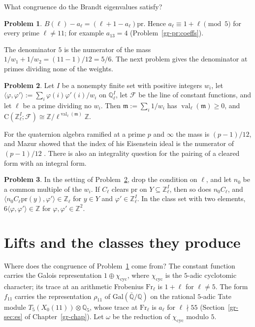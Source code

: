 \documentclass[reqno]{amsart}
\newcounter{chap}
\theoremstyle{definition}
\newtheorem{problem}{Problem}[section]
\newcommand{\Z}{\mathbb{Z}}
\newcommand{\Q}{\mathbb{Q}}
\newcommand{\Cg}{\mathrm{C}}
\newcommand{\pr}{\mathrm{pr}}
\newcommand{\Frob}{\mathrm{Fr}}
\newcommand{\cyc}{\chi_{\mathrm{cyc}}}
\newcommand{\val}{\operatorname{val}}
\begin{document}
What congruence do the Brandt eigenvalues satisfy?

\begin{problem}\label{pr:eleven-cong}
\(B(\ell) - a_\ell = (\ell + 1 - a_\ell)\pr\).  Hence \(a_\ell \equiv 1 + \ell \pmod 5\) for every prime \(\ell \ne 11\); for example \(a_{13} = 4\) (Problem~\ref{gr-pr:coeffs}).
\end{problem}

The denominator \(5\) is the numerator of the mass \(1/w_1 + 1/w_2 = (11 - 1)/12 = 5/6\).  The next problem gives the denominator at primes dividing none of the weights.

\begin{problem}\label{pr:mass}
Let \(I\) be a nonempty finite set with positive integers \(w_i\), let \(\langle \varphi, \varphi' \rangle := \sum_i \varphi(i)\varphi'(i)/w_i\) on \(\Q_\ell^I\), let \(\mathcal F\) be the line of constant functions, and let \(\ell\) be a prime dividing no \(w_i\).  Then \(\mathfrak m := \sum_i 1/w_i\) has \(\val_\ell(\mathfrak m) \ge 0\), and \(\Cg(\Z_\ell^I; \mathcal F) \cong \Z/\ell^{\val_\ell(\mathfrak m)}\Z\).
\end{problem}

For the quaternion algebra ramified at a prime \(p\) and \(\infty\) the mass is \((p-1)/12\), and Mazur showed that the index of his Eisenstein ideal is the numerator of \((p-1)/12\) \cite{Ma}.  There is also an integrality question for the pairing of a cleared form with an integral form.

\begin{problem}\label{pr:pairing}
In the setting of Problem~\ref{pr:mass}, drop the condition on \(\ell\), and let \(n_0\) be a common multiple of the \(w_i\).  If \(C_\ell\) clears \(\pr\) on \(Y \subseteq \Z_\ell^I\), then so does \(n_0C_\ell\), and \(\langle n_0C_\ell\pr(y), \varphi' \rangle \in \Z_\ell\) for \(y \in Y\) and \(\varphi' \in \Z_\ell^I\).  In the class set with two elements, \(6\langle \varphi, \varphi' \rangle \in \Z\) for \(\varphi, \varphi' \in \Z^2\).
\end{problem}

\section{Lifts and the classes they produce}\label{sec:classes}

Where does the congruence of Problem~\ref{pr:eleven-cong} come from?  The constant function carries the Galois representation \(1 \oplus \cyc\), where \(\cyc\) is the \(5\)-adic cyclotomic character; its trace at an arithmetic Frobenius \(\Frob_\ell\) is \(1 + \ell\) for \(\ell \ne 5\).  The form \(f_{11}\) carries the representation \(\rho_{11}\) of \(\mathrm{Gal}(\bar{\Q}/\Q)\) on the rational \(5\)-adic Tate module \(T_5(X_0(11)) \otimes \Q_5\), whose trace at \(\Frob_\ell\) is \(a_\ell\) for \(\ell \nmid 55\) (Section~\ref{gr-sec:es} of Chapter~\ref{gr-chap}).  Let \(\omega\) be the reduction of \(\cyc\) modulo \(5\).
\end{document}
